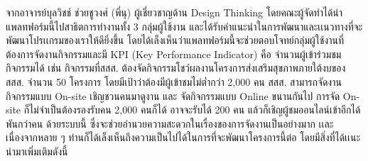 จากอาจารย์บุลวิชช์ ช่วยชูวงศ์ (พี่นุ) ผู้เชี่ยวชาญด้าน Design Thinking
โดยคณะผู้จัดทำได้นำแพลทฟอร์มนี้ไปสาธิตการทำงานทั้ง 3 กลุ่มผู้ใช้งาน และได้รับคำแนะนำในการพัฒนาและเเนวทางที่จะพัฒนาโปรเเกรมของเราให้ดียิ่งขึ้น โดยได้เล็งเห็นว่าแพลทฟอร์มนี้จะช่วยตอบโจทย์กลุ่มผู้ใช้งานที่ต้องการจัดงานกิจกรรมและมี KPI (Key Performance Indicator) คือ จำนวนผู้เข้าร่วมชมกิจกรรมได้ เช่น กิจกรรมที่สสส. ต้องจัดกิจกรรมโชว์ผลงานโครงการส่งเสริมสุขภาพภายใต้งบของ สสส. จำนวน 50 โครงการ โดยมีเป้าว่าต้องมีผู้เข้าชมไม่ต่ำกว่า 2,000 คน สสส. สามารถจัดงานกิจกรรมแบบ On-site เชิญชวนคนมาดูงาน และ
จัดกิจกรรมแบบ Online ขนานกันไป การจัด On-site ก็ไม่จำเป็นต้องรองรับคน 2,000 คนก็ได้ อาจจะรับได้ 200 คน แล้วก็เชิญผู้ชมออนไลน์เข้าอีกได้พันกว่าคน ด้วยระบบนี้ ซึ่งจะช่วยอำนวยความสะดวกในเรื่องของการจัดงานเป็นอย่างมาก เเละเนื่องจากหลาย ๆ ท่านก็ได้เล็งเห็นถึงความเป็นไปได้ในการที่จะพัฒนาโครงการนี้ต่อ โดยมีสิ่งที่ได้เเนะนำมาเพิ่มเติมดังนี้
